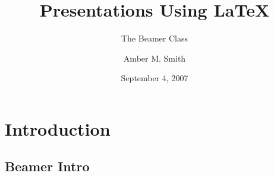 \documentclass[compress]{beamer}
\title{Presentations Using \LaTeX}
\subtitle{The Beamer Class}
\author{Amber M. Smith}
\institute{Department of Mathematics\\ University of Utah \\ \vspace{.25cm}GSAC Colloquium}
\date{September 4, 2007}
\begin{document}

\frame{
	\titlepage 
}



\section{Introduction}
\subsection{Beamer Intro}


\end{document}
